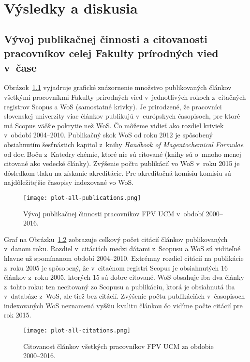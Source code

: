 \chapter{Výsledky a diskusia}

\section{Vývoj publikačnej činnosti a citovanosti pracovníkov celej Fakulty
  prírodných vied v~čase}

Obrázok~\ref{fig:plot.all.publications} vyjadruje grafické znázornenie množstvo
publikovaných článkov všetkými pracovníkmi Fakulty prírodných vied
v~jednotlivých rokoch z~citačných registrov Scopus a WoS (samostatné krivky).
Je prirodzené, že pracovníci slovenskej univerzity viac článkov publikujú
v~európskych časopisoch, pre ktoré má Scopus väčšie pokrytie než WoS.  Čo môžeme
vidieť ako rozdiel kriviek v~období 2004--2010.  Publikačný skok WoS od roku
2012 je spôsobený obsiahnutím šesťnástich kapitol z~knihy \emph{Handbook of
  Magentochemical Formulae} od doc.\,Boču z~Katedry chémie, ktoré nie sú
citované (knihy sú o~mnoho menej citované ako vedecké články).  Zvýšenie počtu
publikácií vo WoS v~roku 2015 je dôsledkom tlaku na získanie akreditácie.  Pre
akreditačná komisiu komisiu sú najdôležitejšie časopisy indexované vo WoS.

\begin{figure}
  \centering
  \texttt{[image: plot-all-publications.png]}
  \caption{Vývoj publikačnej činnosti pracovníkov FPV UCM v~období 2000--2016.}
  \label{fig:plot.all.publications}
\end{figure}

Graf na Obrázku~\ref{fig:plot.all.citations} zobrazuje celkový počet citácií
článkov publikovaných v~danom roku.  Rozdiel v~citáciách medzi dátami z~Scopusu
a WoS sú viditeľné hlavne už spomínanom období 2004--2010.  Extrémny rozdiel
citácií na publikácie z~roku 2005 je spôsobený, že v~citačnom registri Scopus je
obsiahnutých 16 článkov z~roku 2005, ktorých 15 sú dobre citované.  WoS obsahuje
iba dva články z~tohto roku: ten necitovaný zo Scopusu a publikáciu, ktorá je
obsiahnutá iba v~databáze z~WoS, ale tiež bez citácií.  Zvýšenie počtu
publikáciách v~časopisoch indexovaných WoS neznamená vyššiu kvalitu článkou čo
vidíme počte citácií pre rok 2015.

\begin{figure}
  \centering
  \texttt{[image: plot-all-citations.png]}
  \caption{Citovanosť článkov všetkých pracovníkov FPV UCM za obdobie
    2000--2016.}
  \label{fig:plot.all.citations}
\end{figure}



